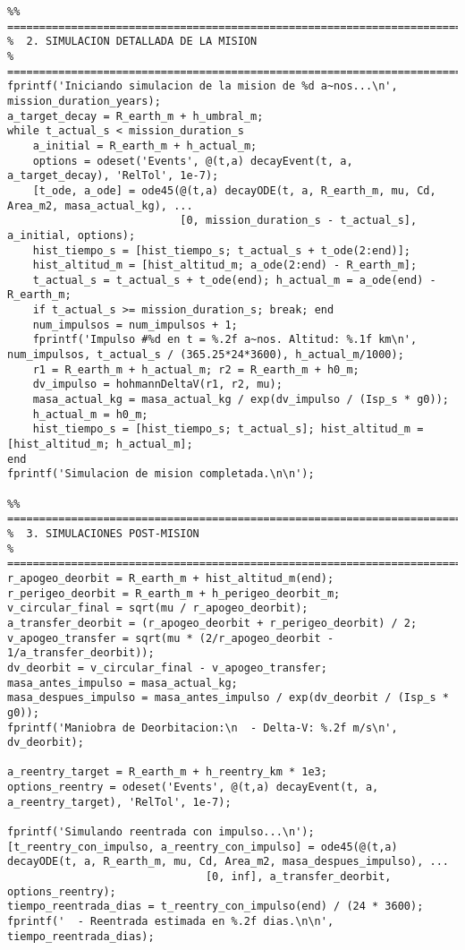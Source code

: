 \begin{verbatim}
%% ========================================================================
%  2. SIMULACION DETALLADA DE LA MISION
%  ========================================================================
fprintf('Iniciando simulacion de la mision de %d a~nos...\n', mission_duration_years);
a_target_decay = R_earth_m + h_umbral_m;
while t_actual_s < mission_duration_s
    a_initial = R_earth_m + h_actual_m;
    options = odeset('Events', @(t,a) decayEvent(t, a, a_target_decay), 'RelTol', 1e-7);
    [t_ode, a_ode] = ode45(@(t,a) decayODE(t, a, R_earth_m, mu, Cd, Area_m2, masa_actual_kg), ...
                           [0, mission_duration_s - t_actual_s], a_initial, options);
    hist_tiempo_s = [hist_tiempo_s; t_actual_s + t_ode(2:end)];
    hist_altitud_m = [hist_altitud_m; a_ode(2:end) - R_earth_m];
    t_actual_s = t_actual_s + t_ode(end); h_actual_m = a_ode(end) - R_earth_m;
    if t_actual_s >= mission_duration_s; break; end
    num_impulsos = num_impulsos + 1;
    fprintf('Impulso #%d en t = %.2f a~nos. Altitud: %.1f km\n', num_impulsos, t_actual_s / (365.25*24*3600), h_actual_m/1000);
    r1 = R_earth_m + h_actual_m; r2 = R_earth_m + h0_m;
    dv_impulso = hohmannDeltaV(r1, r2, mu);
    masa_actual_kg = masa_actual_kg / exp(dv_impulso / (Isp_s * g0));
    h_actual_m = h0_m;
    hist_tiempo_s = [hist_tiempo_s; t_actual_s]; hist_altitud_m = [hist_altitud_m; h_actual_m];
end
fprintf('Simulacion de mision completada.\n\n');

%% ========================================================================
%  3. SIMULACIONES POST-MISION
%  ========================================================================
r_apogeo_deorbit = R_earth_m + hist_altitud_m(end);
r_perigeo_deorbit = R_earth_m + h_perigeo_deorbit_m;
v_circular_final = sqrt(mu / r_apogeo_deorbit);
a_transfer_deorbit = (r_apogeo_deorbit + r_perigeo_deorbit) / 2;
v_apogeo_transfer = sqrt(mu * (2/r_apogeo_deorbit - 1/a_transfer_deorbit));
dv_deorbit = v_circular_final - v_apogeo_transfer;
masa_antes_impulso = masa_actual_kg;
masa_despues_impulso = masa_antes_impulso / exp(dv_deorbit / (Isp_s * g0));
fprintf('Maniobra de Deorbitacion:\n  - Delta-V: %.2f m/s\n', dv_deorbit);

a_reentry_target = R_earth_m + h_reentry_km * 1e3;
options_reentry = odeset('Events', @(t,a) decayEvent(t, a, a_reentry_target), 'RelTol', 1e-7);

fprintf('Simulando reentrada con impulso...\n');
[t_reentry_con_impulso, a_reentry_con_impulso] = ode45(@(t,a) decayODE(t, a, R_earth_m, mu, Cd, Area_m2, masa_despues_impulso), ...
                               [0, inf], a_transfer_deorbit, options_reentry);
tiempo_reentrada_dias = t_reentry_con_impulso(end) / (24 * 3600);
fprintf('  - Reentrada estimada en %.2f dias.\n\n', tiempo_reentrada_dias);


\end{verbatim}
